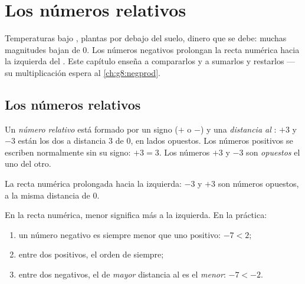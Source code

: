 \chapter{Los números relativos}\label{ch:g7:negatives}

Temperaturas bajo , plantas por debajo del suelo, dinero que se debe: muchas
magnitudes bajan de $0$. Los números negativos prolongan la recta numérica hacia la
izquierda del . Este capítulo enseña a compararlos y a sumarlos
y restarlos --- su multiplicación espera al
\cref{ch:g8:negprod}.

\section{Los números relativos}

\begin{definition}\label{def:g7:negatives:def}
Un \emph{número relativo} está formado por un signo
($+$ o $-$) y una \emph{distancia al }: $+3$ y $-3$ están los dos a
distancia $3$ de $0$, en lados opuestos. Los números positivos se escriben normalmente
sin su signo: $+3 = 3$. Los números $+3$ y $-3$ son
\emph{opuestos} el uno del otro.
\end{definition}

\begin{omfigure}

{\small La recta numérica prolongada hacia la izquierda: $-3$ y $+3$ son
números opuestos, a la misma distancia de $0$.}
\end{omfigure}

\begin{method}\label{met:g7:negatives:compare}
En la recta numérica, menor significa más a la izquierda. En la práctica:
\begin{enumerate}
  \item un número negativo es siempre menor que uno positivo:
        $-7 < 2$;
  \item entre dos positivos, el orden de siempre;
  \item entre dos negativos, el de \emph{mayor} distancia
        al  es el \emph{menor}: $-7 < -2$.
\end{enumerate}
\end{method}

